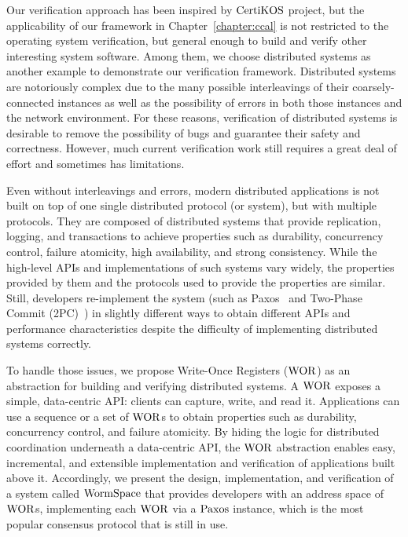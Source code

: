 
Our verification approach has been inspired by $\mathrm{CertiKOS}$ project,
but the applicability of our framework in Chapter~\ref{chapter:ccal} is not restricted to the operating system verification, but general enough
to build and verify other interesting system software. 
Among them, we choose distributed systems as another example to demonstrate our 
verification framework.
Distributed systems are notoriously complex due to the many possible interleavings of their coarsely-connected 
instances as well as the possibility of errors in both those instances and the network environment. 
For these reasons, verification of distributed systems is desirable to remove the possibility of bugs and guarantee their safety and correctness. 
However, much current verification work still requires a great deal of effort and sometimes has limitations.

Even without interleavings and errors, 
modern distributed applications is not built on top of one single distributed protocol (or system), but with multiple protocols.
They are composed of distributed systems that provide replication, 
logging, and transactions to achieve properties such as durability, concurrency control, failure atomicity, high availability, and strong consistency.
While the high-level APIs and implementations of such systems vary widely, 
the properties provided by them and the protocols used to provide the properties are similar. 
Still, developers re-implement the system (such as Paxos~\cite{paxos} and 
Two-Phase Commit (2PC)~\cite{2PC}) in slightly different ways to obtain different APIs and performance 
characteristics despite the difficulty of implementing distributed systems correctly.

To handle those issues, we propose Write-Once Registers ($\mathrm{WOR}$) as an abstraction for building and verifying distributed systems. 
A $\mathrm{WOR}$ exposes a simple, data-centric API: 
clients can capture, write, and read it. 
Applications can use a sequence or a set of $\mathrm{WOR}$s to obtain properties such as durability, concurrency control, and failure atomicity. 
By hiding the logic for distributed coordination underneath a data-centric API, the $\mathrm{WOR}$ abstraction enables easy, incremental, 
and extensible implementation and verification of applications built above it. 
Accordingly, we present the design, implementation, and verification of a system called $\mathrm{WormSpace}$ 
that provides developers with an address space of $\mathrm{WOR}$s, implementing each $\mathrm{WOR}$ via a $\mathrm{Paxos}$ instance,
which is the most popular consensus protocol that is still in use. 

